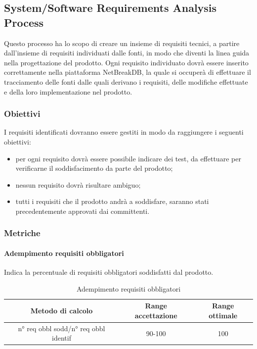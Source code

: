	\subsection{System/Software Requirements Analysis Process}
	Questo processo ha lo scopo di creare un insieme di requisiti tecnici, a partire dall'insieme di requisiti individuati dalle fonti, in modo che diventi la linea guida nella progettazione del prodotto.
	Ogni requisito individuato dovrà essere inserito correttamente nella piattaforma NetBreakDB, la quale si occuperà di effettuare il tracciamento delle fonti dalle quali derivano i requisiti, delle modifiche effettuate e della loro implementazione nel prodotto.
		\subsubsection{Obiettivi}
		I requisiti identificati dovranno essere gestiti in modo da raggiungere i seguenti obiettivi:
		\begin{itemize}
			\item per ogni requisito dovrà essere possibile indicare dei test, da effettuare per verificarne il soddisfacimento da parte del prodotto;
			\item nessun requisito dovrà risultare ambiguo;
			\item tutti i requisiti che il prodotto andrà a soddisfare, saranno stati precedentemente approvati dai committenti.
		\end{itemize}
		\subsubsection{Metriche}
			\paragraph{Adempimento requisiti obbligatori}
			Indica la percentuale di requisiti obbligatori soddisfatti dal prodotto.
			\begin{table}[H]
				\begin{center}
					\begin{tabular}{|c|c|c|}
						\hline
						\textbf{Metodo di calcolo} & \textbf{Range accettazione} & \textbf{Range ottimale} \\
						\hline
						n° req obbl sodd/n° req obbl identif & 90-100  & 100 \\
						\hline
					\end{tabular}
				\end{center}
				\caption{Adempimento requisiti obbligatori}
			\end{table}
	
